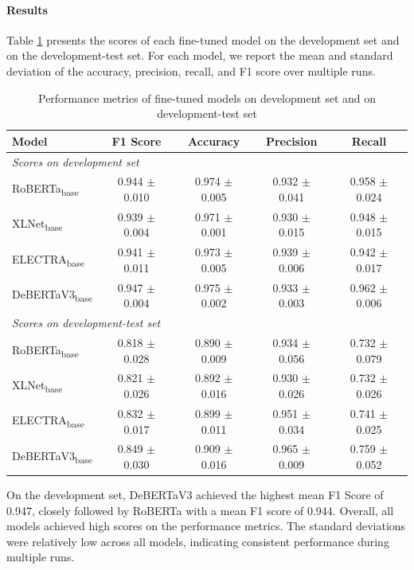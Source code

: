 \paragraph{Results}
Table \ref{tab:finetune_scores} presents the scores of each fine-tuned model on the development set and on the development-test set. For each model, we report the mean and standard deviation of the accuracy, precision, recall, and F1 score over multiple runs. 

\begin{table}[h]
    \centering
    \begin{tabular}{l|c|c|c|c}
    \hline
         \textbf{Model} & F1 Score & Accuracy & Precision & Recall \\
    \hline
    \hline
        \multicolumn{5}{l}{\textit{Scores on development set}}\\
        RoBERTa\textsubscript{base}& 0.944 $\pm$ 0.010 & 0.974 $\pm$ 0.005 & 0.932 $\pm$ 0.041 & 0.958 $\pm$ 0.024\\
        XLNet\textsubscript{base} & 0.939 $\pm$ 0.004 & 0.971 $\pm$ 0.001 & 0.930 $\pm$ 0.015& 0.948 $\pm$ 0.015\\
        ELECTRA\textsubscript{base} & 0.941 $\pm$ 0.011 & 0.973 $\pm$ 0.005 & 0.939 $\pm$ 0.006& 0.942 $\pm$ 0.017\\
        DeBERTaV3\textsubscript{base} & 0.947 $\pm$ 0.004 & 0.975 $\pm$ 0.002 & 0.933 $\pm$ 0.003& 0.962 $\pm$ 0.006\\
    \hline
        \multicolumn{5}{l}{\textit{Scores on development-test set}}\\
         RoBERTa\textsubscript{base}& 0.818 $\pm$ 0.028 & 0.890 $\pm$ 0.009 & 0.934 $\pm$ 0.056 & 0.732 $\pm$ 0.079 \\
         XLNet\textsubscript{base} & 0.821 $\pm$ 0.026 & 0.892 $\pm$ 0.016 & 0.930 $\pm$ 0.026& 0.732 $\pm$ 0.026 \\
         ELECTRA\textsubscript{base} & 0.832 $\pm$ 0.017 & 0.899 $\pm$ 0.011 & 0.951 $\pm$ 0.034 & 0.741 $\pm$ 0.025 \\
         DeBERTaV3\textsubscript{base} & 0.849 $\pm$ 0.030 & 0.909 $\pm$ 0.016 & 0.965 $\pm$ 0.009 & 0.759 $\pm$ 0.052 \\
    \hline
    \end{tabular}
    \caption{Performance metrics of fine-tuned models on development set and on development-test set}
    \label{tab:finetune_scores}
\end{table}

On the development set, DeBERTaV3 achieved the highest mean F1 Score of 0.947, closely followed by RoBERTa with a mean F1 score of 0.944. Overall, all models achieved high scores on the performance metrics. The standard deviations were relatively low across all models, indicating consistent performance during multiple runs.

